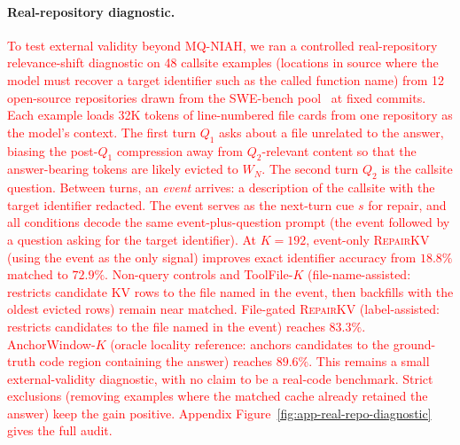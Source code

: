\documentclass{article}
\newcommand{\repairkv}{\textsc{RepairKV}}
\begin{document}
\paragraph{Real-repository diagnostic.}
\textcolor{red}{To test external validity beyond MQ-NIAH, we ran a
controlled real-repository relevance-shift diagnostic on 48 callsite
examples (locations in source where the model must recover a target
identifier such as the called function name) from 12 open-source
repositories drawn from the SWE-bench pool~\citep{swebench} at fixed
commits.
Each example loads 32K tokens of line-numbered file cards from one
repository as the model's context. The first turn $Q_1$ asks about a
file unrelated to the answer, biasing the post-$Q_1$ compression away
from $Q_2$-relevant content so that the answer-bearing tokens are
likely evicted to $W_N$. The second turn $Q_2$ is the callsite
question.
Between turns, an \emph{event} arrives: a description of the
callsite with the target identifier redacted. The event serves as
the next-turn cue $s$ for repair, and all conditions decode the same
event-plus-question prompt (the event followed by a question asking
for the target identifier).
At $K=192$, event-only \repairkv{} (using the event as the only
signal) improves exact identifier accuracy from $18.8\%$ matched to
$72.9\%$.
Non-query controls and ToolFile-$K$ (file-name-assisted: restricts
candidate KV rows to the file named in the event, then backfills
with the oldest evicted rows) remain near matched. File-gated
\repairkv{} (label-assisted: restricts candidates to the file named
in the event) reaches $83.3\%$. AnchorWindow-$K$ (oracle locality
reference: anchors candidates to the ground-truth code region
containing the answer) reaches $89.6\%$.
This remains a small external-validity diagnostic, with no claim to
be a real-code benchmark. Strict exclusions (removing examples where
the matched cache already retained the answer) keep the gain
positive.
Appendix Figure~\ref{fig:app-real-repo-diagnostic} gives the full
audit.}
\end{document}
